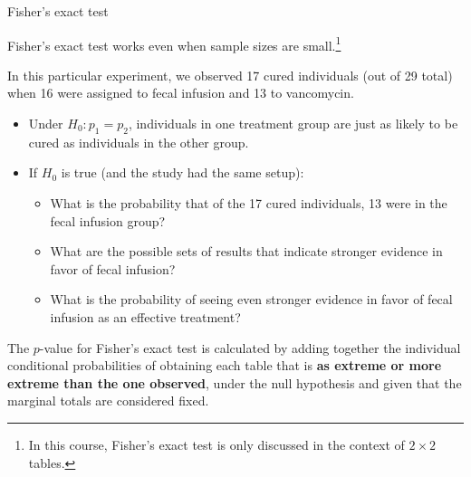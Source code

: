 \documentclass[
  ignorenonframetext,
  aspectratio=169]{beamer}
\begin{document}
\begin{frame}{Fisher's exact test}
\protect\hypertarget{fishers-exact-test}{}
\small

Fisher's exact test works even when sample sizes are
small.\footnote{In this course, Fisher's exact test is only discussed in the context of $2 \times 2$ tables.}

In this particular experiment, we observed 17 cured individuals (out of
29 total) when 16 were assigned to fecal infusion and 13 to vancomycin.

\begin{itemize}
\item
  Under \(H_0: p_1 = p_2\), individuals in one treatment group are just
  as likely to be cured as individuals in the other group.
\item
  If \(H_0\) is true (and the study had the same setup):

  \begin{itemize}

    \footnotesize

    \item What is the probability that of the 17 cured individuals, 13 were in the fecal infusion group?

    \item What are the possible sets of results that indicate stronger evidence in favor of fecal infusion?

    \item What is the probability of seeing even stronger evidence in favor of fecal infusion as an effective treatment?

    \end{itemize}
\end{itemize}

The \(p\)-value for Fisher's exact test is calculated by adding together
the individual conditional probabilities of obtaining each table that is
\textbf{as extreme or more extreme than the one observed}, under the
null hypothesis and given that the marginal totals are considered fixed.
\end{frame}
\end{document}
